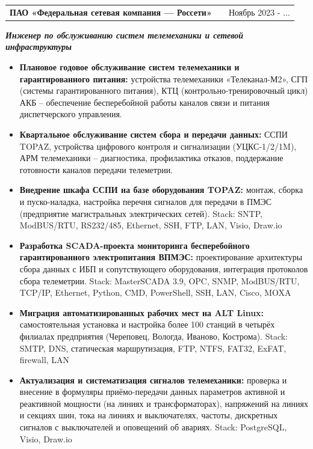 \documentclass[a4paper,12pt]{article}
\makeatletter
\newenvironment{joblong}[3]
    {
    \begin{tabularx}{\linewidth}{@{}l X r@{}}
    \textbf{#1} & \hfill &  #2 \\[1.5pt]
    \end{tabularx}
    \noindent\small\textbf{\textit{#3}}\par
    \vspace{1.5pt}
    \begin{minipage}[t]{\linewidth}
    \begin{itemize}[nosep,after=\strut, leftmargin=1em, itemsep=1.5pt,label=--]
    }
    {
    \end{itemize}
    \end{minipage}    
    }
\makeatother
\begin{document}
\begin{joblong}{ПАО «Федеральная сетевая компания --- Россети»}{Ноябрь 2023 - ...}{Инженер по обслуживанию систем телемеханики и сетевой инфраструктуры}
\item \textbf{Плановое годовое обслуживание систем телемеханики и гарантированного питания:} устройства телемеханики «Телеканал-М2», СГП (системы гарантированного питания), КТЦ (контрольно-тренировочный цикл) АКБ -- обеспечение бесперебойной работы каналов связи и питания диспетчерского управления.
\item \textbf{Квартальное обслуживание систем сбора и передачи данных:} ССПИ TOPAZ, устройства цифрового контроля и сигнализации (УЦКС-1/2/1M), АРМ телемеханики -- диагностика, профилактика отказов, поддержание готовности каналов передачи телеметрии.
\item \textbf{Внедрение шкафа ССПИ на базе оборудования TOPAZ:} монтаж, сборка и пуско-наладка, настройка перечня сигналов для передачи в ПМЭС (предприятие магистральных электрических сетей). Stack: SNTP, ModBUS/RTU, RS232/485, Ethernet, SSH, FTP, LAN, Visio, Draw.io
\item \textbf{Разработка SCADA-проекта мониторинга бесперебойного гарантированного электропитания ВПМЭС:} проектирование архитектуры сбора данных с ИБП и сопутствующего оборудования, интеграция протоколов сбора телеметрии. Stack: MasterSCADA 3.9, OPC, SNMP, ModBUS/RTU, TCP/IP, Ethernet, Python, CMD, PowerShell, SSH, LAN, Cisco, MOXA
\item \textbf{Миграция автоматизированных рабочих мест на ALT Linux:} самостоятельная установка и настройка более 100 станций в четырёх филиалах предприятия (Череповец, Вологда, Иваново, Кострома). Stack: SMTP, DNS, статическая маршрутизация, FTP, NTFS, FAT32, ExFAT, firewall, LAN
\item \textbf{Актуализация и систематизация сигналов телемеханики:} проверка и внесение в формуляры приёмо-передачи данных параметров активной и реактивной мощности (на линиях и трансформаторах), напряжений на линиях и секциях шин, тока на линиях и выключателях, частоты, дискретных сигналов с выключателей и оповещений об авариях. Stack: PostgreSQL, Visio, Draw.io
\end{joblong}


\end{document}

